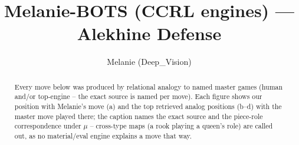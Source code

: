 \documentclass[11pt]{article}
\title{Melanie-BOTS (CCRL engines) — Alekhine Defense}
\author{Melanie (Deep\_Vision)}
\date{}
\begin{document}
\maketitle

\begin{abstract}Every move below was produced by relational analogy to named master games (human and/or top-engine -- the exact source is named per move). Each figure shows our position with Melanie's move (a) and the top retrieved analog positions (b--d) with the master move played there; the caption names the exact source and the piece-role correspondence under $\mu$ -- cross-type maps (a rook playing a queen's role) are called out, as no material/eval engine explains a move that way.\end{abstract}

\begin{figure}[p]\centering
\begin{subfigure}{0.46\textwidth}\centering
\resizebox{\linewidth}{!}{%
\newchessgame
\chessboard[
  setfen={rnbqk2r/ppp1ppbp/1n1p2p1/4P3/3P4/1B3N2/PPP2PPP/RNBQ1RK1 b kq - 5 7},
  showmover=false,
  pgfstyle=straightmove, color=movearrow, markmove={e7-e6}
]}
\caption{}
\end{subfigure}\hfill
\begin{subfigure}{0.46\textwidth}\centering
\resizebox{\linewidth}{!}{%
\newchessgame
\chessboard[
  setfen={rnbqk2r/ppp1ppbp/1n1p2p1/4P3/P2P4/1B3N2/1PP2PPP/RNBQK2R b KQkq - 0 7},
  showmover=false,
  pgfstyle=straightmove, color=movearrow, markmove={a7-a5}
]}
\caption{}
\end{subfigure}
\\[4pt]
\begin{subfigure}{0.46\textwidth}\centering
\resizebox{\linewidth}{!}{%
\newchessgame
\chessboard[
  setfen={rnbqk2r/ppp1ppbp/1n1p2p1/4P3/P2P4/1B3N2/1PP2PPP/RNBQK2R b KQkq - 0 7},
  showmover=false,
  pgfstyle=straightmove, color=movearrow, markmove={a7-a5}
]}
\caption{}
\end{subfigure}\hfill
\begin{subfigure}{0.46\textwidth}\centering
\resizebox{\linewidth}{!}{%
\newchessgame
\chessboard[
  setfen={rn1qkb1r/pb3ppp/1p1ppn2/2p5/2PP4/2NBPN2/PP3PPP/R1BQ1RK1 b kq - 1 7},
  showmover=false,
  pgfstyle=straightmove, color=movearrow, markmove={b8-d7}
]}
\caption{}
\end{subfigure}

\end{figure}
\end{document}
